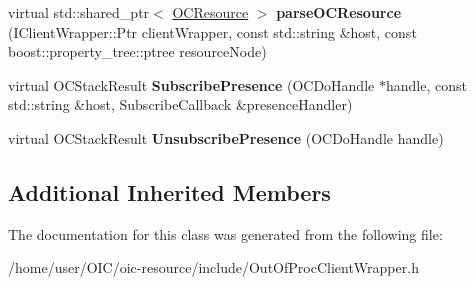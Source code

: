 \begin{DoxyCompactItemize}
\item 
\hypertarget{classOC_1_1OutOfProcClientWrapper_a2038efbb54810e76b816731bb566e0b3}{}virtual std\+::shared\+\_\+ptr$<$ \hyperlink{classOC_1_1OCResource}{O\+C\+Resource} $>$ {\bfseries parse\+O\+C\+Resource} (I\+Client\+Wrapper\+::\+Ptr client\+Wrapper, const std\+::string \&host, const boost\+::property\+\_\+tree\+::ptree resource\+Node)\label{classOC_1_1OutOfProcClientWrapper_a2038efbb54810e76b816731bb566e0b3}

\item 
\hypertarget{classOC_1_1OutOfProcClientWrapper_ad7142a92eb637a344364cb123a1511eb}{}virtual O\+C\+Stack\+Result {\bfseries Subscribe\+Presence} (O\+C\+Do\+Handle $\ast$handle, const std\+::string \&host, Subscribe\+Callback \&presence\+Handler)\label{classOC_1_1OutOfProcClientWrapper_ad7142a92eb637a344364cb123a1511eb}

\item 
\hypertarget{classOC_1_1OutOfProcClientWrapper_a933522d46114355eba91f7d7ee1a5db2}{}virtual O\+C\+Stack\+Result {\bfseries Unsubscribe\+Presence} (O\+C\+Do\+Handle handle)\label{classOC_1_1OutOfProcClientWrapper_a933522d46114355eba91f7d7ee1a5db2}

\end{DoxyCompactItemize}
\subsection*{Additional Inherited Members}


The documentation for this class was generated from the following file\+:\begin{DoxyCompactItemize}
\item 
/home/user/\+O\+I\+C/oic-\/resource/include/Out\+Of\+Proc\+Client\+Wrapper.\+h\end{DoxyCompactItemize}

